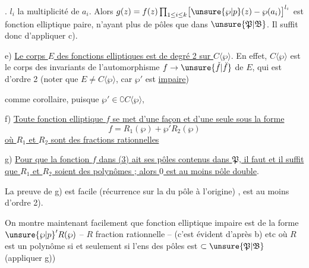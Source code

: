 . $l_i$ la multiplicité de $a_i$. Alors $g(z)=f(z)\prod_{1\leq i\leq k}\bigl[\unsure{\wp|p}(z)-\wp(a_i)\bigr]^{l_i}$ est fonction elliptique paire, n'ayant plus de pôles que dans $\unsure{\mathfrak P|\mathfrak B}$. Il suffit donc d'appliquer c).


e) \uline{Le corps $E$ des fonctions elliptiques est de degré 2 sur $C\langle\wp\rangle$}. En effet, $C\langle\wp\rangle$ est le corps des invariants de l'automorphisme $f\to\unsure{\check f|\breve f}$ de $E$, qui est d'ordre 2 (noter que $E\ne C\langle\wp\rangle$, car $\wp'$ est \uline{impaire})

comme corollaire, puisque $\wp'\in\complement C\langle\wp\rangle$,

f) \uline{Toute fonction elliptique $f$ se met d'une façon et d'une seule sous la forme}
\[
f=R_1(\wp)+\wp'R_2(\wp)\tag*{(3)}
\]
\uline{où $R_1$ et $R_2$ sont des fractions rationnelles}

 

g)  \uline{Pour que la fonction $f$ dans (3) ait ses pôles contenus dans $\mathfrak P$, il faut et il suffit que $R_1$ et $R_2$ soient des polynômes ; alors $0$ est au moins pôle double}.


La preuve de g) est  facile (récurrence sur la  du pôle à l'origine) , est au moins d'ordre 2).

On montre maintenant  facilement que  fonction elliptique impaire est de la forme $\mathord{\unsure{\wp|p}}'R(\wp)$ -- $R$ fraction rationnelle -- (c'est évident d'après b) etc où $R$ est un polynôme si et seulement si l'ens des pôles est $\subset\unsure{\mathfrak P|\mathfrak B}$ (appliquer g))

